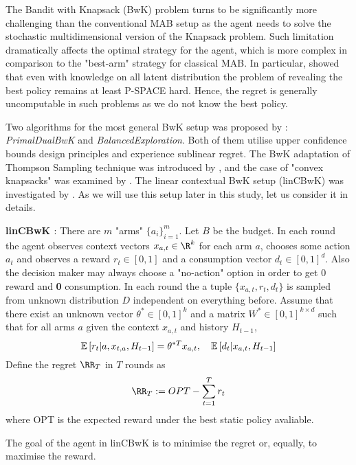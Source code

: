   The Bandit with Knapsack (BwK) problem turns to be significantly more challenging than the conventional MAB setup as the agent needs to solve the stochastic multidimensional version of the Knapsack problem. Such limitation dramatically affects the optimal strategy for the agent, which is more complex in comparison to the "best-arm" strategy for classical MAB. In particular, \cite{Papadimitriou1999} showed that even with knowledge on all latent distribution the problem of revealing the best policy remains at least P-SPACE hard. Hence, the regret is generally uncomputable in such problems as we do not know the best policy. 
  
  Two algorithms for the most general BwK setup was proposed by \cite{Badanidiyuru2013}: \textit{PrimalDualBwK} and \textit{BalancedExploration}. Both of them utilise upper confidence bounds design principles and experience sublinear regret. The BwK adaptation of Thompson Sampling technique was introduced by \cite{Xia2015}, and the case of "convex knapsacks" was examined by \cite{Agrawal2014}. The linear contextual BwK setup (linCBwK) was investigated by \cite{Agrawal2015}. As we will use this setup later in this study, let us consider it in details.
  
  \begin{definition} \textbf{linCBwK \cite{Agrawal2015}}:
      There are $m$ "arms" $\{a_i\}_{i=1}^m$. Let $B$ be the budget. In each round the agent observes context vectors $x_{a,t} \in \R^k$ for each arm $a$, chooses some action $a_t$ and observes a reward $r_t \in [0, 1]$ and a consumption vector $d_t \in [0,1]^d$. Also the decision maker may always choose a "no-action" option in order to get 0 reward and \textbf{0} consumption. In each round the a tuple $\{x_{a,t}, r_t, d_t\}$ is sampled from unknown distribution $D$ independent on everything before. Assume that there exist an unknown vector $\theta^* \in [0,1]^k$ and a matrix $W^* \in [0,1]^{k \times d}$ such that for all arms $a$ given the context $x_{a,t}$ and history $H_{t-1}$,
      \[
        \operatorname{\mathbb{E}}\left[r_t|a, x_{t,a}, H_{t-1}\right] = \theta^{*T}x_{a,t}, \quad \operatorname{\mathbb{E}}\left[d_{t}|x_{a,t}, H_{t-1} \right]
      \]
      Define the regret $\RR_T$ in $T$ rounds as 
      \[
        \RR_T := OPT - \sum_{t=1}^T r_t
      \]
      where OPT is the expected reward under the best static policy avaliable. 
      
      The goal of the agent in linCBwK is to minimise the regret or, equally, to maximise the reward. 
      
  \end{definition} 

